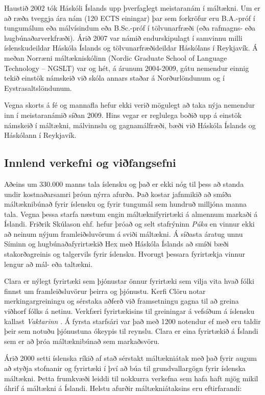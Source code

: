 \begin{multicols}{2}
Haustið 2002 tók Háskóli Íslands upp þverfaglegt meistaranám í máltækni. Um er að ræða tveggja ára nám (120 ECTS einingar) þar sem forkröfur eru B.A.-próf í tungumálum eða málvísindum eða B.Sc.-próf í tölvunarfræði (eða rafmagns- eða hugbúnaðarverkfræði). Árið 2007 var námið endurskipulagt í samvinnu milli íslenskudeildar Háskóla Íslands og tölvunarfræðideildar Háskólans í Reykjavík. Á meðan Norræni máltækniskólinn (Nordic Graduate School of Language Technology -- NGSLT) var og hét, á árunum 2004-2009, gátu nemendur einnig tekið einstök námskeið við skóla annars staðar á Norðurlöndunum og í Eystrasaltslöndunum.

Vegna skorts á fé og mannafla hefur ekki verið mögulegt að taka nýja nemendur inn í meistaranámið síðan 2009. Hins vegar er reglulega boðið upp á einstök námskeið í máltækni, málvinnslu og gagnamálfræði, bæði við Háskóla Íslands og Háskólann í Reykjavík.

\subsection{Innlend verkefni og viðfangsefni}

Aðeins um 330.000 manns tala íslensku og það er ekki nóg til þess að standa undir kostnaðarsamri þróun nýrra afurða. Það kostar jafnmikið að smíða máltæknibúnað fyrir íslensku og fyrir tungumál sem hundruð milljóna manna tala. Vegna þessa starfa næstum engin máltæknifyrirtæki á almennum markaði á Íslandi. Friðrik Skúlason ehf. hefur þróað og selt stafrýninn \textit{Púka} en vinnur ekki að neinum nýjum framleiðsluvörum á sviði máltækni. Á síðasta áratug unnu Síminn og hugbúnaðafyrirtækið Hex með Háskóla Íslands að smíði bæði stakorðagreinis og talgervils fyrir íslensku. Hvorugt þessara fyrirtækja vinnur lengur að mál- eða taltækni.

Clara er nýlegt fyrirtæki sem þjónustar önnur fyrirtæki sem vilja vita hvað fólki finnst um framleiðsluvörur þeirra og þjónustu. Kerfi Clöru notar merkingargreiningu og sérstaka aðferð við framsetningu gagna til að greina viðhorf fólks á netinu. Verkfæri fyrirtækisins til greiningar á vefsíðum á íslensku kallast \textit{Vaktarinn} \cite{vak1}.  Á fyrsta starfsári var það með 1200 notendur ef með eru taldir þeir sem notuðu þjónustuna ókeypis til reynslu. Clara er eina fyrirtækið á Íslandi sem er að þróa máltæknibúnað sem markaðsvöru.

Árið 2000 setti íslenska ríkið af stað sérstakt máltækniátak með það fyrir augum að styðja stofnanir og fyrirtæki í því að búa til grundvallargögn fyrir íslenska máltækni. Þetta frumkvæði leiddi til nokkurra verkefna sem hafa haft mjög mikil áhrif á máltækni á Íslandi. Helstu afurðir máltækniátaksins eru eftirfarandi: \cite{ilrt1} \newline 


\end{multicols}
